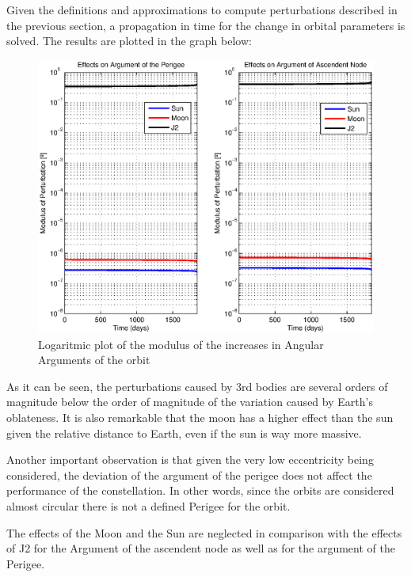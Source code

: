 Given the definitions and approximations to compute perturbations described in the previous section, a propagation in time for the change in orbital parameters is solved. The results are plotted in the graph below:

\begin{figure}[H]
\centering
\includegraphics[scale=0.7]{SignificativePerturbations/ModulusAngulars.eps}
\caption{Logaritmic plot of the modulus of the increases in Angular Arguments of the orbit}
\end{figure}

As it can be seen, the perturbations caused by 3rd bodies are several orders of magnitude below the order of magnitude of the variation caused by Earth's oblateness. It is also remarkable that the moon has a higher effect than the sun given the relative distance to Earth, even if the sun is way more massive.

Another important observation is that given the very low eccentricity being considered, the deviation of the argument of the perigee does not affect the performance of the constellation. In other words, since the orbits are considered almost circular there is not a defined Perigee for the orbit.

The effects of the Moon and the Sun are neglected in comparison with the effects of J2 for the Argument of the ascendent node as well as for the argument of the Perigee.